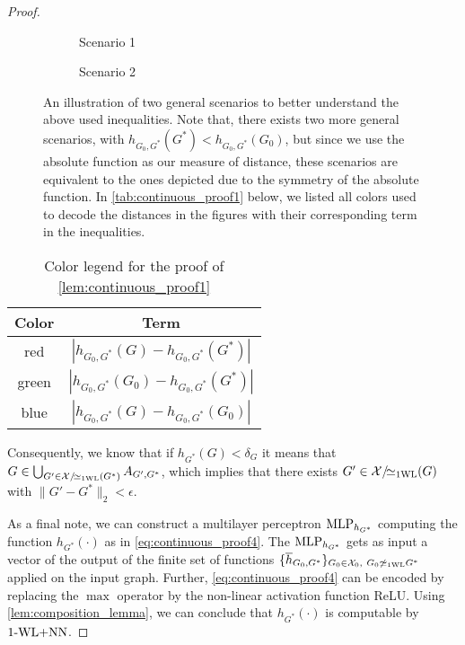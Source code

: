 \begin{proof}
\begin{enumerate}
        \begin{figure}[H]
            \centering
            \begin{subfigure}{0.45\textwidth}
                \centering
                
                \caption{Scenario 1}      
            \end{subfigure}
            \begin{subfigure}{0.45\textwidth}
                \centering
                 
                \caption{Scenario 2}        
            \end{subfigure}
            \caption{An illustration of two general scenarios to better understand the above used inequalities. Note that, there exists two more general scenarios, with $h_{G_0, G^*}(G^*) < h_{G_0, G^*}(G_0)$, but since we use the absolute function as our measure of distance, these scenarios are equivalent to the ones depicted due to the symmetry of the absolute function. In \autoref{tab:continuous_proof1} below, we listed all colors used to decode the distances in the figures with their corresponding term in the inequalities.}
            \label{fig:proof_support}
        \end{figure}
        \begin{table}[H]
            \centering
            \begin{tabular}{ c | c }
                Color & Term \\
                \hline
                red  & $|h_{G_0, G^*}(G) - h_{G_0, G^*}(G^*)|$\\
                green & $|h_{G_0, G^*}(G_0) - h_{G_0, G^*}(G^*)|$\\ 
                blue & $|h_{G_0, G^*}(G) - h_{G_0, G^*}(G_0)|$\\
            \end{tabular}
            \caption{Color legend for the proof of \autoref{lem:continuous_proof1}}
            \label{tab:continuous_proof1}
        \end{table}
        Consequently, we know that if $h_{G^*}(G) < \delta_G$ it means that $G \in \bigcup_{G' \in \mathcal{X}/\!{\simeq_{\text{1WL}}}(G^*)} A_{G', G^*}$, which implies that there exists $G' \in \mathcal{X}/\!{\simeq_{\text{1WL}}}(G)$ with $\|G' - G^*\|_2 < \epsilon$.
    \end{enumerate}

    As a final note, we can construct a multilayer perceptron $\text{MLP}_{h_{G^*}}$ computing the function $h_{G^*}(\cdot)$ as in \autoref{eq:continuous_proof4}. The $\text{MLP}_{h_{G^*}}$ gets as input a vector of the output of the finite set of functions $\{ \overline{h}_{G_0, G^*}\}_{G_0 \in \mathcal{X}_0, \  G_0 \not \simeq_{\text{1WL}} G^*}$ applied on the input graph. Further, \autoref{eq:continuous_proof4} can be encoded by replacing the $\max$ operator by the non-linear activation function ReLU. Using \autoref{lem:composition_lemma}, we can conclude that $h_{G^*}(\cdot)$ is computable by $\text{1-WL+NN}$.

\end{proof}

